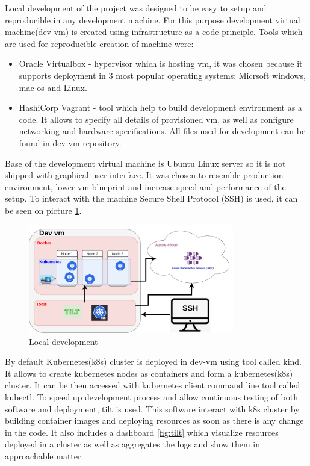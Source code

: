 Local development of the project was designed to be easy to setup and reproducible in any development machine. For this purpose development virtual machine(dev-vm) is created using infrastructure-as-a-code principle. Tools which are used for reproducible creation of machine were:
\begin{itemize}
    \item Oracle Virtualbox\cite{virtual_box} - hypervisor which is hosting vm, it was chosen because it supports deployment in 3 most popular operating systems: Micrsoft windows, mac os and Linux.
    \item HashiCorp Vagrant\cite{vagrant} - tool which help to build development environment as a code. It allows to specify all details of provisioned vm, as well as configure networking and hardware specifications. All files used for development can be found in dev-vm repository\cite{dev_vm}.
\end{itemize}

Base of the development virtual machine is Ubuntu Linux server so it is not shipped with graphical user interface. It was chosen to resemble production environment, lower vm blueprint and increase speed and performance of the setup. To interact with the machine Secure Shell Protocol (SSH) is used, it can be seen on picture \ref{fig:local_development}.

\begin{figure}[H]
    \centering
    \includegraphics[width=0.8\textwidth]{pictures/development_setup.png}
    \caption{ Local development }
    \label{fig:local_development}
\end{figure}

By default Kubernetes(k8s) cluster is deployed in dev-vm using tool called kind. It allows to create kubernetes nodes as containers and form a kubernetes(k8s) cluster. It can be then accessed with kubernetes client command line tool called kubectl. To speed up development process and allow continuous testing of both software and deployment, tilt is used. This software interact with k8s cluster by building container images and deploying resources as soon as there is any change in the code. It also includes a dashboard \ref{fig:tilt} which visualize resources deployed in a cluster as well as aggregates the logs and show them in approachable matter.


